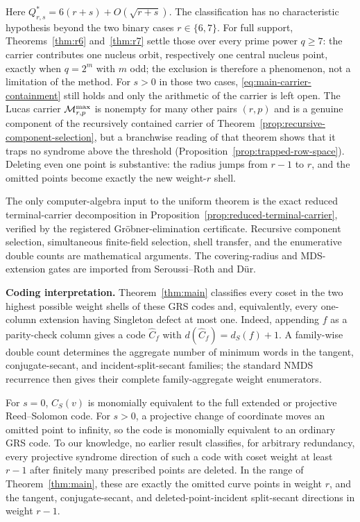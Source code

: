 Here \(Q^*_{r,s}=6(r+s)+O(\sqrt{r+s})\).  The classification has no
characteristic hypothesis beyond the two binary cases \(r\in\{6,7\}\).
For full support, Theorems~\ref{thm:r6} and~\ref{thm:r7} settle those over
every prime power \(q\geq7\): the carrier contributes one nucleus orbit,
respectively one central nucleus point, exactly when \(q=2^m\) with \(m\)
odd; the exclusion is therefore a phenomenon, not a limitation of the
method.  For \(s>0\) in those two cases, \eqref{eq:main-carrier-containment}
still holds and only the arithmetic of the carrier is left open.  The Lucas carrier \(\mathcal M^{\max}_{r,p}\) is nonempty for many other
pairs \((r,p)\) and is a genuine component of the recursively contained
carrier of Theorem~\ref{prop:recursive-component-selection}, but a
branchwise reading of that theorem shows that it traps no syndrome above
the threshold (Proposition~\ref{prop:trapped-row-space}).  Deleting
even one point is substantive: the radius jumps from \(r-1\) to \(r\), and the
omitted points become exactly the new weight-\(r\) shell.

The only computer-algebra input to the uniform theorem is the exact reduced
terminal-carrier decomposition in Proposition~\ref{prop:reduced-terminal-carrier},
verified by the registered Gr\"obner-elimination certificate.  Recursive
component selection, simultaneous finite-field selection, shell transfer, and
the enumerative double counts are mathematical arguments.  The covering-radius
and MDS-extension gates are imported from Seroussi--Roth and D\"ur.

\noindent\textbf{Coding interpretation.}
Theorem~\ref{thm:main} classifies every coset in the two highest possible
weight shells of these GRS codes and, equivalently, every one-column extension
having Singleton defect at most one.
Indeed, appending \(f\) as a parity-check column gives a code \(\widehat C_f\)
with \(d(\widehat C_f)=d_S(f)+1\).  A family-wise double count
determines the aggregate number of minimum words in the tangent,
conjugate-secant, and incident-split-secant families; the standard NMDS
recurrence then gives their complete family-aggregate weight enumerators.

For \(s=0\), \(C_S(v)\) is monomially equivalent to the full extended or
projective Reed--Solomon code.  For \(s>0\), a projective change of coordinate moves an
omitted point to infinity, so the code is monomially equivalent to an
ordinary GRS code.  To our knowledge, no earlier result classifies, for
arbitrary redundancy, every projective syndrome direction of such a code
with coset weight at least \(r-1\) after finitely many prescribed points are
deleted.  In the range of Theorem~\ref{thm:main}, these are exactly the
omitted curve points in weight \(r\), and the tangent, conjugate-secant, and
deleted-point-incident split-secant directions in weight \(r-1\).

